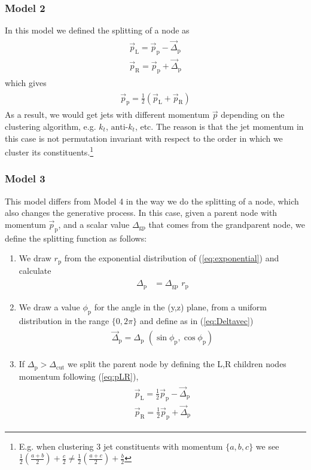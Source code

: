 \documentclass[12pt]{article}
\newcommand{\bea}{\begin{eqnarray}\begin{aligned}}
\newcommand{\eea}{\end{aligned}\end{eqnarray}}
\begin{document}
\subsubsection{Model 2}

In this model we defined the splitting of a node as
\bea\label{eq:pLRb}
\vec{p}_\text{L}= \vec{p}_\text{p} - \vec{\Delta}_\text{p}  \\
\vec{p}_\text{R}= \vec{p}_\text{p} +\vec{\Delta}_\text{p}
\eea
which gives
\bea
\vec{p}_\text{p}= \frac{1}{2} (\vec{p}_\text{L} + \vec{p}_\text{R} ) 
\eea
As a result, we would get jets with different momentum $\vec{p}$ depending on the clustering algorithm, e.g. $k_t$, $\text{anti-}k_t$, etc. The reason is that the jet momentum in this case is not permutation invariant with respect to the order in which we cluster its constituents.\footnote{E.g. when clustering 3 jet constituents with momentum $\{a,b,c\}$ we see $\frac{1}{2}(\frac{a+b}{2})+\frac{c}{2} \neq \frac{1}{2}(\frac{a+c}{2})+\frac{b}{2}$}

\subsubsection{Model 3}

This model differs from Model 4 in the way we do the splitting of a node, which also changes the generative process. In this case, given a parent node with momentum $\vec{p}_\text{p}$, and a scalar value $\Delta_{\text{gp}}$ that comes from the grandparent node, we define the splitting function as follows:
\begin{enumerate}

\item We draw $r_\text{p}$ from the exponential distribution of (\ref{eq:exponential}) and calculate
\bea\label{rp}
\Delta_\text{p} &= \Delta_\text{gp} \,\, r_\text{p}
\eea

\item We draw a value $\phi_\text{p}$ for the angle in the (y,z) plane, from a uniform distribution in the range $\{0,2\pi\}$ and define as in (\ref{eq:Deltavec})
\bea
\vec{\Delta}_\text{p}= \Delta_\text{p}\,\,(\sin\phi_\text{p},\cos\phi_\text{p})\nonumber
\eea 

\item If $\Delta_\text{p} > \Delta_\text{cut}$ we split the parent node by defining the L,R children nodes momentum following (\ref{eq:pLR}),
\bea
\vec{p}_\text{L}= \frac{1}{2} \vec{p}_\text{p} - \vec{\Delta}_\text{p}  \\
\vec{p}_\text{R}= \frac{1}{2} \vec{p}_\text{p} +\vec{\Delta}_\text{p} \nonumber
\eea

\end{enumerate}
\end{document}
